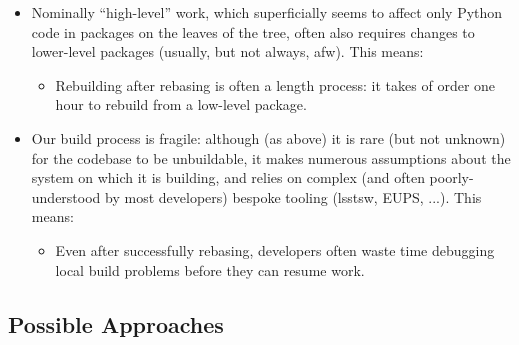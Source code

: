 \documentclass[DM,toc]{lsstdoc}
\begin{document}
\begin{itemize}
  \item{Nominally ``high-level'' work, which superficially seems to affect
  only Python code in packages on the leaves of the tree, often also requires
  changes to lower-level packages (usually, but not always, afw). This means:

    \begin{itemize}

      \item{Rebuilding after rebasing is often a length process: it takes of
      order one hour to rebuild from a low-level package.}

    \end{itemize}

  }

  \item{Our build process is fragile: although (as above) it is rare (but not
  unknown) for the codebase to be unbuildable, it makes numerous assumptions
  about the system on which it is building, and relies on complex (and often
  poorly-understood by most developers) bespoke tooling (lsstsw, EUPS, ...).
  This means:

    \begin{itemize}

      \item{Even after successfully rebasing, developers often waste time
      debugging local build problems before they can resume work.}

    \end{itemize}

  }

\end{itemize}

\subsection{Possible Approaches}
\end{document}
